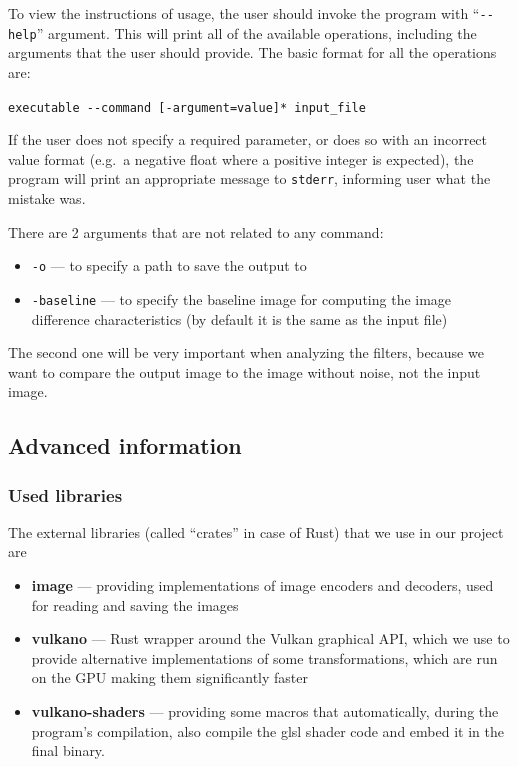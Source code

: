 \documentclass[12pt]{article}
\theoremstyle{definition}
\begin{document}
To view the instructions of usage, the user should invoke the program with ``\lstinline{--help}'' argument.
This will print all of the available operations, including the arguments that the user should provide.
The basic format for all the operations are:
\begin{center}
    \lstinline{executable --command [-argument=value]* input_file}
\end{center}

If the user does not specify a required parameter, or does so with an incorrect value format (e.g.\ a negative float where a positive integer is expected), 
the program will print an appropriate message to \texttt{stderr}, informing user what the mistake was.

There are 2 arguments that are not related to any command:
\begin{itemize}
    \item[] \texttt{-o} --- to specify a path to save the output to
    \item[] \texttt{-baseline} --- to specify the baseline image for computing the image difference characteristics (by default it is the same as the input file)
\end{itemize}

The second one will be very important when analyzing the filters, because we want to compare the output image to the image without noise, not the input image.

\subsection{Advanced information}
\subsubsection{Used libraries}
The external libraries (called ``crates'' in case of Rust) that we use in our project are
\begin{itemize}
    \item \textbf{image} --- providing implementations of image encoders and decoders,
          used for reading and saving the images
    \item \textbf{vulkano} --- Rust wrapper around the Vulkan graphical API,
          which we use to provide alternative implementations of some transformations,
          which are run on the GPU making them significantly faster
    \item \textbf{vulkano-shaders} --- providing some macros that automatically,
          during the program's compilation,
          also compile the glsl shader code and embed it in the final binary.
\end{itemize}
\end{document}
